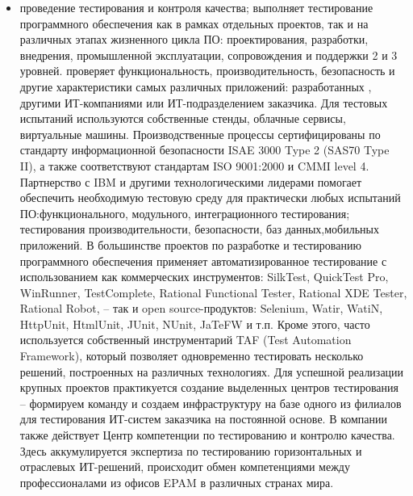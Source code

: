 \begin{itemize}
  \item проведение тестирования и контроля качества;
  \company{} выполняет тестирование программного обеспечения как в рамках отдельных проектов, так и на различных этапах жизненного цикла ПО: проектирования, разработки, внедрения, промышленной эксплуатации, сопровождения и поддержки 2 и 3 уровней. \company{} проверяет функциональность, производительность, безопасность и другие характеристики самых различных приложений: разработанных \company{}, другими ИТ-компаниями или ИТ-подразделением заказчика.
  Для тестовых испытаний используются собственные стенды, облачные сервисы, виртуальные машины. Производственные процессы \company{} сертифицированы по стандарту информационной безопасности ISAE 3000 Type 2 (SAS70 Type II), а также соответствуют стандартам ISO 9001:2000 и CMMI level 4. Партнерство с IBM и другими технологическими лидерами помогает обеспечить необходимую тестовую среду для практически любых испытаний ПО:функционального, модульного, интеграционного тестирования; тестирования производительности, безопасности, баз данных,мобильных приложений.
  В большинстве проектов по разработке и тестированию программного обеспечения \company{} применяет автоматизированное тестирование с использованием как коммерческих инструментов: SilkTest, QuickTest Pro, WinRunner, TestComplete, Rational Functional Tester, Rational XDE Tester, Rational Robot, – так и open source-продуктов: Selenium, Watir, WatiN, HttpUnit, HtmlUnit, JUnit, NUnit, JaTeFW и т.п. Кроме этого, часто используется собственный инструментарий TAF (Test Automation Framework), который позволяет одновременно тестировать несколько решений, построенных на различных технологиях.
  Для успешной реализации крупных проектов практикуется создание выделенных центров тестирования – формируем команду и создаем инфраструктуру на базе одного из филиалов \company{} для тестирования ИТ-систем заказчика на постоянной основе. В компании также действует Центр компетенции по тестированию и контролю качества. Здесь аккумулируется экспертиза по тестированию горизонтальных и отраслевых ИТ-решений, происходит обмен компетенциями между профессионалами из офисов EPAM в различных странах мира.


\end{itemize}
